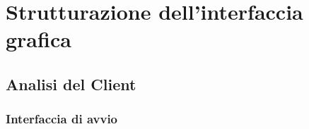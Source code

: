 \chapter{Strutturazione dell'interfaccia grafica}
\minitoc\mtcskip

\section{Analisi del Client}\label{sec:clientanalisys}
\subsection{Interfaccia di avvio}

\begin{figure}[p]
 \centering
   \\
   \\

\end{figure}
